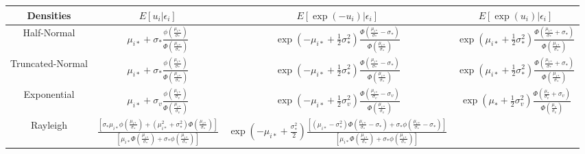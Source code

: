 \documentclass[nojss]{jss}
\begin{document}
\begin{appendix}
\begin{table}[h]
\begin{threeparttable}
\renewcommand{\arraystretch}{1.3}
\centering
\begin{adjustbox}{max width=1\textwidth}
\begin{tabular}{@{}cccc@{}}
\toprule
Densities & $E\left[u_i|\epsilon_i\right]$ & $E\left[\exp{\left(-u_i\right)|\epsilon_i}\right]$ & $E\left[\exp{\left(u_i\right)|\epsilon_i}\right]$\\
\midrule
Half-Normal & $\mu_{i*} + \sigma_*\frac{\phi\left(\frac{\mu_{i*}}{\sigma_*}\right)}{\Phi\left(\frac{\mu_{i*}}{\sigma_*}\right)}$ & 
$\exp{\left(-\mu_{i*} + \frac{1}{2}\sigma_*^2\right)} \frac{\Phi\left(\frac{\mu_{i*}}{\sigma_*}-\sigma_*\right)}{\Phi\left(\frac{\mu_{i*}}{\sigma_*}\right)}$ & 
$\exp{\left(\mu_{i*} + \frac{1}{2}\sigma_*^2\right)} \frac{\Phi\left(\frac{\mu_{i*}}{\sigma_*}+\sigma_*\right)}{\Phi\left(\frac{\mu_{i*}}{\sigma_*}\right)}$\\
Truncated-Normal & $\mu_{i*} + \sigma_*\frac{\phi\left(\frac{\mu_{i*}}{\sigma_*}\right)}{\Phi\left(\frac{\mu_{i*}}{\sigma_*}\right)}$ & 
$\exp{\left(-\mu_{i*} + \frac{1}{2}\sigma_*^2\right)} \frac{\Phi\left(\frac{\mu_{i*}}{\sigma_*}-\sigma_*\right)}{\Phi\left(\frac{\mu_{i*}}{\sigma_*}\right)}$ & 
$\exp{\left(\mu_{i*} + \frac{1}{2}\sigma_*^2\right)} \frac{\Phi\left(\frac{\mu_{i*}}{\sigma_*}+\sigma_*\right)}{\Phi\left(\frac{\mu_{i*}}{\sigma_*}\right)}$ \\
Exponential & $\mu_{i*} + \sigma_v\frac{\phi\left(\frac{\mu_{i*}}{\sigma_v}\right)}{\Phi\left(\frac{\mu_{i*}}{\sigma_v}\right)}$ & 
$\exp{\left(-\mu_{i*} + \frac{1}{2}\sigma_v^2\right)} \frac{\Phi\left(\frac{\mu_{i*}}{\sigma_v}-\sigma_v\right)}{\Phi\left(\frac{\mu_{i*}}{\sigma_v}\right)}$ & 
$\exp{\left(\mu_* + \frac{1}{2}\sigma_v^2\right)} \frac{\Phi\left(\frac{\mu_*}{\sigma_v}+\sigma_v\right)}{\Phi\left(\frac{\mu_*}{\sigma_v}\right)}$\\
Rayleigh & $\frac{\left[\sigma_*\mu_{i*}\phi\left(\frac{\mu_{i*}}{\sigma_*}\right) + \left(\mu_{i*}^2+\sigma_*^2\right)\Phi\left(\frac{\mu_{i*}}{\sigma_*}\right)\right]}{\left[\mu_{i*}\Phi\left(\frac{\mu_{i*}}{\sigma_*}\right) + \sigma_*\phi\left(\frac{\mu_{i*}}{\sigma_*}\right)\right]}$ &
$\exp{\left(-\mu_{i*} +\frac{\sigma_*^2}{2}\right)}\frac{\left[\left(\mu_{i*}-\sigma_*^2\right)\Phi\left(\frac{\mu_{i*}}{\sigma_*} - \sigma_*\right) + \sigma_*\phi\left(\frac{\mu_{i*}}{\sigma_*} - \sigma_*\right)\right]}{\left[\mu_{i*}\Phi\left(\frac{\mu_{i*}}{\sigma_*}\right) + \sigma_*\phi\left(\frac{\mu_{i*}}{\sigma_*}\right)\right]}$ &

\end{tabular}
\end{adjustbox}
\end{threeparttable}
\end{table}
\end{appendix}
\end{document}
